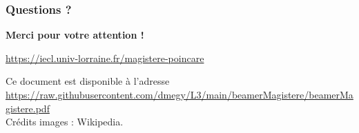 \documentclass[slidetop,11pt]{beamer}
\begin{document}
\begin{frame}
\frametitle{Questions ?}

\begin{center}
{\LARGE \bf Merci pour votre attention !}

\bigskip
{}

\bigskip
\url{https://iecl.univ-lorraine.fr/magistere-poincare}

\bigskip
{\tiny Ce document est disponible à l'adresse\\
\url{https://raw.githubusercontent.com/dmegy/L3/main/beamerMagistere/beamerMagistere.pdf}\\
Crédits images : Wikipedia.}
\end{center}
\end{frame}
  
\end{document}
